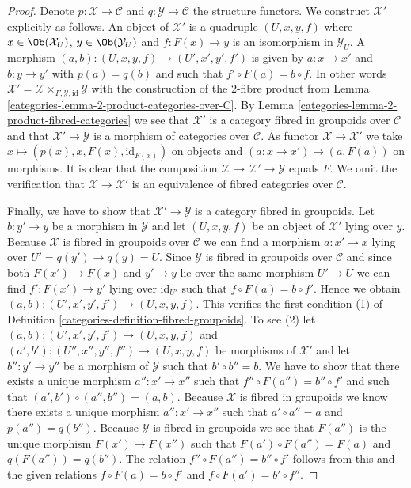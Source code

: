 \begin{proof}

Denote $p : \mathcal{X} \to \mathcal{C}$ and $q : \mathcal{Y} \to \mathcal{C}$
the structure functors. We construct $\mathcal{X}'$ explicitly as follows.
An object of $\mathcal{X}'$ is a quadruple $(U, x, y, f)$ where
$x \in \Ob(\mathcal{X}_U)$, $y \in \Ob(\mathcal{Y}_U)$
and $f : F(x) \to y$ is an isomorphism in $\mathcal{Y}_U$.
A morphism $(a, b) : (U, x, y, f) \to (U', x', y', f')$ is given
by $a : x \to x'$ and $b : y \to y'$ with $p(a) = q(b)$ and
such that $f' \circ F(a) = b \circ f$. In other words
$\mathcal{X}' = \mathcal{X} \times_{F, \mathcal{Y}, \text{id}} \mathcal{Y}$
with the construction of the $2$-fibre product from
Lemma \ref{categories-lemma-2-product-categories-over-C}.
By
Lemma \ref{categories-lemma-2-product-fibred-categories}
we see that $\mathcal{X}'$ is a category fibred in groupoids over
$\mathcal{C}$ and that $\mathcal{X}' \to \mathcal{Y}$ is a morphism of
categories over $\mathcal{C}$. As functor $\mathcal{X} \to \mathcal{X}'$ we take
$x \mapsto (p(x), x, F(x), \text{id}_{F(x)})$ on objects and
$(a : x \to x') \mapsto (a, F(a))$ on morphisms. It is clear that
the composition $\mathcal{X} \to \mathcal{X}' \to \mathcal{Y}$
equals $F$. We omit the verification that
$\mathcal{X} \to \mathcal{X}'$ is an equivalence of fibred categories over
$\mathcal{C}$.

\medskip\noindent
Finally, we have to show that $\mathcal{X}' \to \mathcal{Y}$ is a category
fibred in groupoids. Let $b : y' \to y$ be a morphism in $\mathcal{Y}$
and let $(U, x, y, f)$ be an object of $\mathcal{X}'$ lying over $y$.
Because $\mathcal{X}$ is fibred in groupoids over $\mathcal{C}$ we
can find a morphism $a : x' \to x$ lying over $U' = q(y') \to q(y) = U$.
Since $\mathcal{Y}$ is fibred in groupoids over $\mathcal{C}$ and since
both $F(x') \to F(x)$ and $y' \to y$ lie over the same morphism $U' \to U$
we can find $f' : F(x') \to y'$ lying over $\text{id}_{U'}$ such that
$f \circ F(a) = b \circ f'$. Hence we obtain
$(a, b) : (U', x', y', f') \to (U, x, y, f)$.
This verifies the first condition (1) of
Definition \ref{categories-definition-fibred-groupoids}.
To see (2) let
$(a, b) : (U', x', y', f') \to (U, x, y, f)$ and
$(a', b') : (U'', x'', y'', f'') \to (U, x, y, f)$ be morphisms of
$\mathcal{X}'$ and let $b'' : y' \to y''$ be a morphism of $\mathcal{Y}$
such that $b' \circ b'' = b$. We have to show that there exists
a unique morphism $a'' : x' \to x''$ such that
$f'' \circ F(a'') = b'' \circ f'$ and such that
$(a', b') \circ (a'', b'') = (a, b)$. Because $\mathcal{X}$ is fibred
in groupoids we know there exists a unique morphism
$a'' : x' \to x''$ such that $a' \circ a'' = a$ and $p(a'') = q(b'')$.
Because $\mathcal{Y}$ is fibred in groupoids we see that
$F(a'')$ is the unique morphism $F(x') \to F(x'')$ such that
$F(a') \circ F(a'') = F(a)$ and $q(F(a'')) = q(b'')$. The relation
$f'' \circ F(a'') = b'' \circ f'$ follows from this and the given
relations $f \circ F(a) = b \circ f'$ and $f \circ F(a') = b' \circ f''$.
\end{proof}


